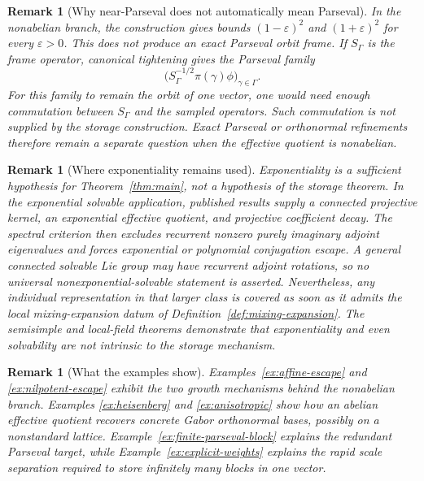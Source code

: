 \documentclass[10pt,a4paper]{amsart}
\numberwithin{equation}{section}
\newtheorem{remark}[theorem]{Remark}
\begin{document}
\begin{remark}[Why near-Parseval does not automatically mean Parseval]
In the nonabelian branch, the construction gives bounds
$(1-\varepsilon)^2$ and $(1+\varepsilon)^2$ for every $\varepsilon>0$.
This does not produce an exact Parseval orbit frame.  If $S_\Gamma$ is the
frame operator, canonical tightening gives the Parseval family
\[
 \bigl(S_\Gamma^{-1/2}\pi(\gamma)\phi\bigr)_{\gamma\in\Gamma}.
\]
For this family to remain the orbit of one vector, one would need enough
commutation between $S_\Gamma$ and the sampled operators.  Such commutation
is not supplied by the storage construction.  Exact Parseval or
orthonormal refinements therefore remain a separate question when the
effective quotient is nonabelian.
\end{remark}

\begin{remark}[Where exponentiality remains used]
Exponentiality is a sufficient hypothesis for Theorem~\ref{thm:main}, not a
hypothesis of the storage theorem.  In the exponential solvable application,
published results supply a connected projective kernel, an exponential
effective quotient, and projective coefficient decay.  The spectral criterion
then excludes recurrent nonzero purely imaginary adjoint eigenvalues and
forces exponential or polynomial conjugation escape.  A general connected
solvable Lie group may have recurrent adjoint rotations, so no universal
nonexponential-solvable statement is asserted.  Nevertheless, any individual
representation in that larger class is covered as soon as it admits the local
mixing-expansion datum of Definition~\ref{def:mixing-expansion}.  The
semisimple and local-field theorems demonstrate that exponentiality and even
solvability are not intrinsic to the storage mechanism.
\end{remark}

\begin{remark}[What the examples show]
Examples~\ref{ex:affine-escape} and \ref{ex:nilpotent-escape} exhibit the two
growth mechanisms behind the nonabelian branch.  Examples
\ref{ex:heisenberg} and \ref{ex:anisotropic} show how an abelian effective
quotient recovers concrete Gabor orthonormal bases, possibly on a
nonstandard lattice.  Example~\ref{ex:finite-parseval-block} explains the
redundant Parseval target, while Example~\ref{ex:explicit-weights} explains
the rapid scale separation required to store infinitely many blocks in one
vector.
\end{remark}
\end{document}
